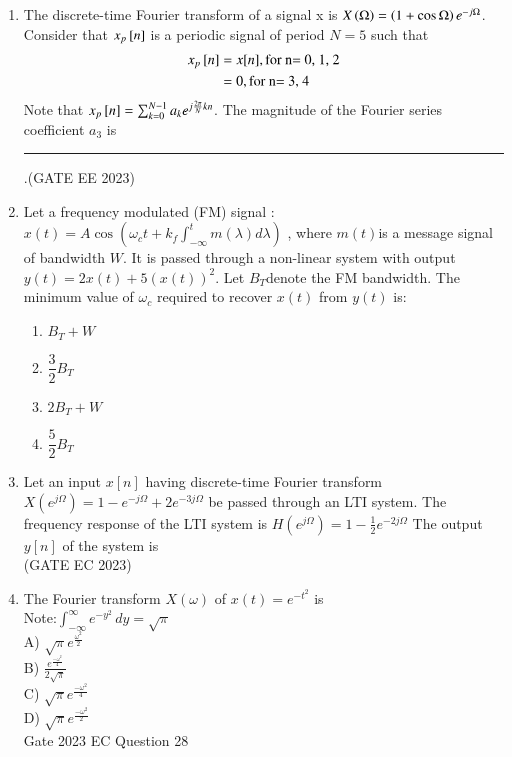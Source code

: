 \begin{enumerate}[label=\thechapter.\arabic*,ref=\thechapter.\theenumi]
    \item The discrete-time Fourier transform of a signal x is $X\left(\Omega\right)=\left(1+\cos{\Omega}\right)e^{-j\Omega}$. Consider that $x_{p}{}\left[n\right]$ is a periodic signal of period $N=5$ such that
        \begin{align}
            x_p{}\left[n\right]&=x[n],\text{for n= 0, 1, 2}\\
            &=0,\text{for n= 3, 4}
        \end{align}
        Note that $x_p{}\left[n\right]=\sum_{k=0}^{N-1}a_{k}e^{j\frac{2\pi}{N}kn}$. The magnitude of the Fourier series coefficient $a_3$ is \rule{3cm}{0.15mm} .\hfill(GATE EE 2023)
        \solution
        \newpage

\item Let a frequency modulated (FM) signal : $ x(t) = A \cos(\omega_c t + k_f \int_{-\infty}^{t} m(\lambda) d\lambda)$ , where $ m(t) $is a message signal of bandwidth $ W $. It is passed through a non-linear system with output $y(t) = 2x(t) + 5(x(t))^2 $.
Let $B_T $denote the FM bandwidth. The minimum value of $ \omega_c $ required to recover $ x(t) $ from $ y(t) $ is:\\
\begin{enumerate}[label = (\Alph*)]
\item $B_T + W$ \\
\item $\dfrac{3}{2} B_T$ \\
\item $2B_T + W$ \\
\item $\dfrac{5}{2} B_T$ \\
\end{enumerate}

\solution
\newpage

\item Let an input $x[n]$ having discrete-time Fourier transform
$X(e^{j\Omega}) = 1 - e^{-j\Omega} + 2e^{-3j\Omega}$
be passed through an LTI system. The frequency response of the LTI system is 
$H(e^{j\Omega}) = 1 - \frac{1}{2} e^{-2j\Omega}$
The output $y[n]$ of the system is \\ \hfill(GATE EC 2023)
\solution 
\newpage
\item The Fourier transform $X(\omega)$ of $x(t) = e^{-t^2}$ is\\
Note:$\int_{-\infty}^{\infty} e^{-y^2} \,dy = \sqrt{\pi}$ \\  
A) $\sqrt{\pi} e^{\frac{\omega^2}{2}}$ \\
B) $\frac{e^{\frac{-\omega^2}{4}}}{2\sqrt{\pi}}$ \\
C) $\sqrt{\pi} e^{\frac{-\omega^2}{4}}$ \\
D) $\sqrt{\pi} e^{\frac{-\omega^2}{2}}$\\
\hfill Gate 2023 EC Question 28
\newpage


\end{enumerate}
